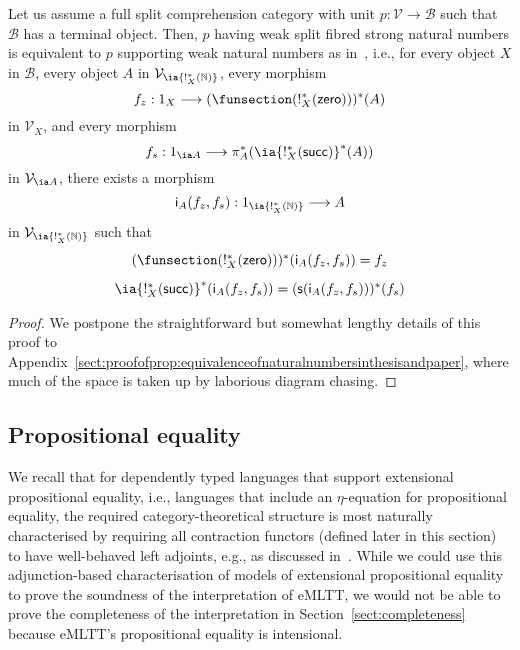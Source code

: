 \begin{proposition}
\label{prop:equivalenceofnaturalnumbersinthesisandpaper}
Let us assume a full split comprehension category with unit \linebreak $p : \mathcal{V} \longrightarrow \mathcal{B}$ such that $\mathcal{B}$ has a terminal object. Then, $p$ having weak split fibred strong natural numbers is equivalent to $p$ supporting weak natural numbers as in~\cite{Ahman:FibredEffects}, i.e., for every object $X$ in $\mathcal{B}$, every object $A$ in $\mathcal{V}_{\ia {!_X^*(\mathbb{N})}}$, every morphism 
\[
f_z : 1_X \longrightarrow (\funsection(!_X^*(\mathsf{zero})))^*(A)
\]
in $\mathcal{V}_X$, and every morphism 
\[
f_s : 1_{\ia A} \longrightarrow \pi_A^*(\ia {!_X^*(\mathsf{succ})}^* (A))
\]
in $\mathcal{V}_{\ia A}$, there exists a morphism 
\[
\mathsf{i}_A(f_z,f_s) : 1_{\ia {!^*_X(\mathbb{N})}} \longrightarrow A
\]
in $\mathcal{V}_{\ia {!^*_X(\mathbb{N})}}$ such that 
\[
\begin{array}{c}
(\funsection(!_X^*(\mathsf{zero})))^*(\mathsf{i}_A(f_z,f_s)) = f_z
\\[3mm]
\ia {!_X^*(\mathsf{succ})}^* (\mathsf{i}_A(f_z,f_s)) 
=
(\mathsf{s}(\mathsf{i}_A(f_z,f_s)))^*(f_s) 
\end{array}
\vspace{0.2cm}
\]
\end{proposition}

\begin{proof}
We postpone the straightforward but somewhat lengthy details of this proof to Appendix~\ref{sect:proofofprop:equivalenceofnaturalnumbersinthesisandpaper}, where much of the space is taken up by laborious diagram chasing.
\end{proof}




\subsection{Propositional equality}

We recall that for dependently typed languages that support extensional propositional equality, i.e., languages that include an $\eta$-equation for propositional equality, the required category-theoretical structure is most naturally characterised by requiring all contraction functors (defined later in this section) to have well-behaved left adjoints, e.g., as discussed in~\cite[Section~10.5]{Jacobs:Book}.
While we could use this adjunction-based characterisation of models of extensional propositional equality to prove the soundness of the interpretation of eMLTT, we would not be able to prove the completeness of the interpretation in Section~\ref{sect:completeness} because eMLTT's propositional equality is intensional.

